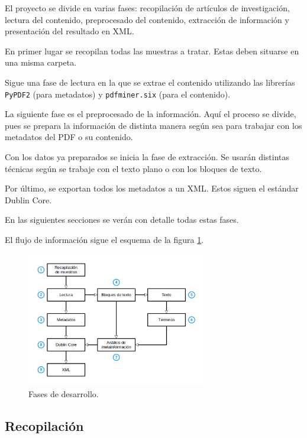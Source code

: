 \documentclass[../main.tex]{subfiles}
\begin{document}
\lstset{
	numbers=left,
	stepnumber=1,
	firstnumber=1,
	numberfirstline=true,
	xleftmargin=3em,
	xrightmargin=3em,
}

El proyecto se divide en varias fases: recopilación de artículos de investigación, lectura del contenido, preprocesado del contenido, extracción de información y presentación del resultado en XML.

En primer lugar se recopilan todas las muestras a tratar. Estas deben situarse en una misma carpeta.

Sigue una fase de lectura en la que se extrae el contenido utilizando las librerías \texttt{PyPDF2} (para metadatos) y \texttt{pdfminer.six} (para el contenido).

La siguiente fase es el preprocesado de la información. Aquí el proceso se divide, pues se prepara la información de distinta manera según sea para trabajar con los metadatos del PDF o su contenido.

Con los datos ya preparados se inicia la fase de extracción. Se usarán distintas técnicas según se trabaje con el texto plano o con los bloques de texto.

Por último, se exportan todos los metadatos a un XML. Estos siguen el estándar Dublin Core.

En las siguientes secciones se verán con detalle todas estas fases.

El flujo de información sigue el esquema de la figura \ref{fig:development-phases}.

\begin{figure}[h]
  \centering
    \includegraphics[width=0.7\textwidth]{../images/development-phases.png}
  \caption{Fases de desarrollo.}
  \label{fig:development-phases}
\end{figure}


\subsection{Recopilación}
\end{document}
